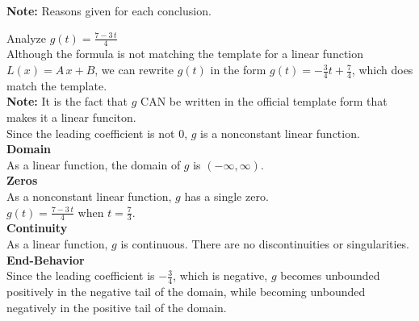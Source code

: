 \documentclass{ximera}
\begin{document}
\textbf{Note:} Reasons given for each conclusion. \\













\begin{example}

Analyze $g(t) = \frac{7 - 3 \, t}{4}$  \\


Although the formula is not matching the template for a linear function $L(x) = A \, x + B$, we can rewrite $g(t)$ in the form $g(t) = -\frac{3}{4} t + \frac{7}{4}$, which does match the template. \\

\textbf{Note:} It is the fact that $g$ CAN be written in the official template form that makes it a linear funciton. \\



Since the leading coefficient is not $0$, $g$ is a nonconstant linear function.\\



\textbf{Domain} \\

As a linear function, the domain of $g$ is $(-\infty, \infty)$.\\


\textbf{Zeros} \\

As a nonconstant linear function, $g$ has a single zero.\\

$g(t) = \frac{7 - 3 \, t}{4}$ when $t = \frac{7}{3}$. \\


\textbf{Continuity} \\

As a linear function, $g$ is continuous.  There are no discontinuities or singularities. \\



\textbf{End-Behavior} \\

Since the leading coefficient is $-\frac{3}{4}$, which is negative, $g$ becomes unbounded positively in the negative tail of the domain, while becoming unbounded negatively in the positive tail of the domain.




\end{example}
\end{document}
